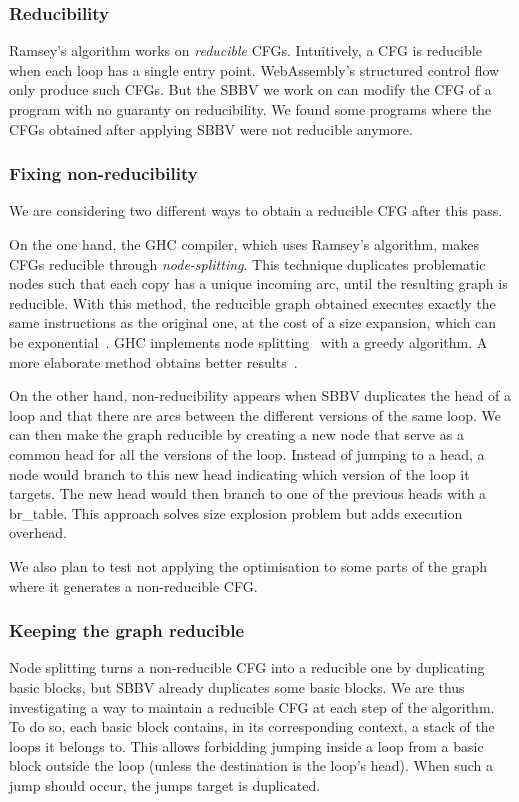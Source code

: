 \documentclass[a4paper,11pt]{article}
\begin{document}
\subsubsection{Reducibility}
Ramsey's algorithm works on \emph{reducible} CFGs. Intuitively, a CFG is
reducible when each loop has a single entry point. WebAssembly's structured
control flow only produce such CFGs. But the SBBV we work on can modify the CFG
of a program with no guaranty on reducibility. We found some programs where the
CFGs obtained after applying SBBV were not reducible anymore.

\subsubsection{Fixing non-reducibility}
We are considering two different ways to obtain a reducible CFG after this pass.

On the one hand, the GHC compiler, which uses Ramsey's algorithm, makes CFGs
reducible through \emph{node-splitting}. This technique duplicates problematic
nodes such that each copy has a unique incoming arc, until the resulting graph
is reducible. With this method, the reducible graph obtained executes exactly
the same instructions as the original one, at the cost of a size expansion,
which can be exponential~\cite{carter2003folklore}. GHC implements node
splitting~\cite[Appendix~A]{ramsey2022beyond} with a greedy algorithm. A more
elaborate method obtains better results~\cite{janssen1997making}.

On the other hand, non-reducibility appears when SBBV duplicates the head of a
loop and that there are arcs between the different versions of the same loop. We
can then make the graph reducible by creating a new node that serve as a common
head for all the versions of the loop. Instead of jumping to a head, a node
would branch to this new head indicating which version of the loop it targets.
The new head would then branch to one of the previous heads with a
\textsf{br\_table}. This approach solves size explosion problem but adds
execution overhead.

We also plan to test not applying the optimisation to some parts of the graph
where it generates a non-reducible CFG\@.

\subsubsection{Keeping the graph reducible}
Node splitting turns a non-reducible CFG into a reducible one by duplicating
basic blocks, but SBBV already duplicates some basic blocks. We are thus
investigating a way to maintain a reducible CFG at each step of the algorithm.
To do so, each basic block contains, in its corresponding context, a stack of
the loops it belongs to. This allows forbidding jumping inside a loop from a
basic block outside the loop (unless the destination is the loop's head). When
such a jump should occur, the jumps target is duplicated.
\end{document}
